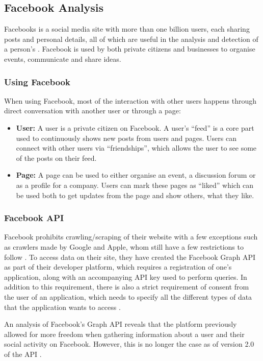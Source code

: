 \subsection{Facebook Analysis}\label{sec:facebook-analysis}
Facebooks is a social media site with more than one billion users, each sharing
posts and personal details, all of which are useful in the analysis and
detection of a person's \fbp. Facebook is used by both private citizens and
businesses to organise events, communicate and share ideas.

\subsubsection{Using Facebook}
When using Facebook, most of the interaction with other users happens through
direct conversation with another user or through a page:

\begin{itemize}
  \item \textbf{User:} A user is a private citizen on Facebook. A user's
  ``feed'' is a core part used to continuously shows new posts from users and
  pages. Users can connect with other users via ``friendships'', which allows
  the user to see some of the posts on their feed.
  \item \textbf{Page:} A page can be used to either organise an event, a
  discussion forum or as a profile for a company. Users can mark these pages as
  ``liked'' which can be used both to get updates from the page and show
  others, what they like.
\end{itemize}


\subsubsection{Facebook API}
Facebook prohibits crawling/scraping of their website with a few exceptions such
as crawlers made by Google and Apple, whom still have a few restrictions to
follow \citep{FacebookRobotsTxt}. To access data on their site, they have
created the Facebook Graph \ac{API} as part of their developer platform, which
requires a registration of one's application, along with an accompanying
\ac{API} key used to perform queries. In addition to this requirement, there is
also a strict requirement of consent from the user of an application, which
needs to specify all the different types of data that the application wants to
access \citep{FacebookGraphApiAccessTokens,facebookPolicy}.\nl

An analysis of Facebook's Graph \ac{API} \citep{FacebookGraphApiDocumentation}
reveals that the platform previously allowed for more freedom when gathering
information about a user and their social activity on Facebook. However, this is
no longer the case as of version 2.0 of the \ac{API}
\citep{FacebookChangesInGraphTwoPointOh}.\nl

